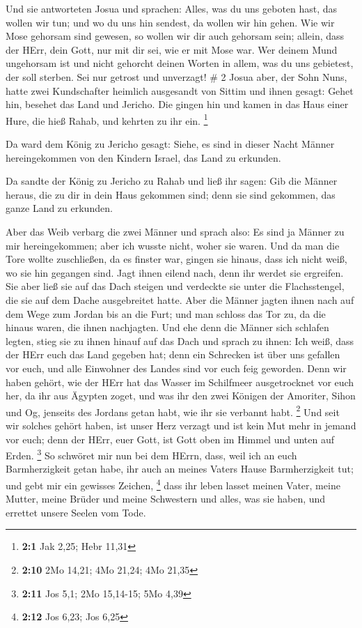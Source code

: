  Und sie antworteten Josua und sprachen: Alles, was du uns
geboten hast, das wollen wir tun; und wo du uns hin sendest, da wollen
wir hin gehen.  Wie wir Mose gehorsam sind gewesen, so
wollen wir dir auch gehorsam sein; allein, dass der HErr, dein Gott, nur
mit dir sei, wie er mit Mose war.  Wer deinem Mund
ungehorsam ist und nicht gehorcht deinen Worten in allem, was du uns
gebietest, der soll sterben. Sei nur getrost und unverzagt! \# 2
 Josua aber, der Sohn Nuns, hatte zwei Kundschafter heimlich
ausgesandt von Sittim und ihnen gesagt: Gehet hin, besehet das Land und
Jericho. Die gingen hin und kamen in das Haus einer Hure, die hieß
Rahab, und kehrten zu ihr ein. \footnote{\textbf{2:1} Jak 2,25; Hebr
  11,31}

 Da ward dem König zu Jericho gesagt: Siehe, es sind in
dieser Nacht Männer hereingekommen von den Kindern Israel, das Land zu
erkunden.

 Da sandte der König zu Jericho zu Rahab und ließ ihr sagen:
Gib die Männer heraus, die zu dir in dein Haus gekommen sind; denn sie
sind gekommen, das ganze Land zu erkunden.

 Aber das Weib verbarg die zwei Männer und sprach also: Es
sind ja Männer zu mir hereingekommen; aber ich wusste nicht, woher sie
waren.  Und da man die Tore wollte zuschließen, da es
finster war, gingen sie hinaus, dass ich nicht weiß, wo sie hin gegangen
sind. Jagt ihnen eilend nach, denn ihr werdet sie ergreifen.
 Sie aber ließ sie auf das Dach steigen und verdeckte sie
unter die Flachsstengel, die sie auf dem Dache ausgebreitet hatte.
 Aber die Männer jagten ihnen nach auf dem Wege zum Jordan
bis an die Furt; und man schloss das Tor zu, da die hinaus waren, die
ihnen nachjagten.  Und ehe denn die Männer sich schlafen
legten, stieg sie zu ihnen hinauf auf das Dach  und sprach
zu ihnen: Ich weiß, dass der HErr euch das Land gegeben hat; denn ein
Schrecken ist über uns gefallen vor euch, und alle Einwohner des Landes
sind vor euch feig geworden.  Denn wir haben gehört, wie
der HErr hat das Wasser im Schilfmeer ausgetrocknet vor euch her, da ihr
aus Ägypten zoget, und was ihr den zwei Königen der Amoriter, Sihon und
Og, jenseits des Jordans getan habt, wie ihr sie verbannt habt.
\footnote{\textbf{2:10} 2Mo 14,21; 4Mo 21,24; 4Mo 21,35} 
Und seit wir solches gehört haben, ist unser Herz verzagt und ist kein
Mut mehr in jemand vor euch; denn der HErr, euer Gott, ist Gott oben im
Himmel und unten auf Erden. \footnote{\textbf{2:11} Jos 5,1; 2Mo
  15,14-15; 5Mo 4,39}  So schwöret mir nun bei dem HErrn,
dass, weil ich an euch Barmherzigkeit getan habe, ihr auch an meines
Vaters Hause Barmherzigkeit tut; und gebt mir ein gewisses Zeichen,
\footnote{\textbf{2:12} Jos 6,23; Jos 6,25}  dass ihr leben
lasset meinen Vater, meine Mutter, meine Brüder und meine Schwestern und
alles, was sie haben, und errettet unsere Seelen vom Tode.

